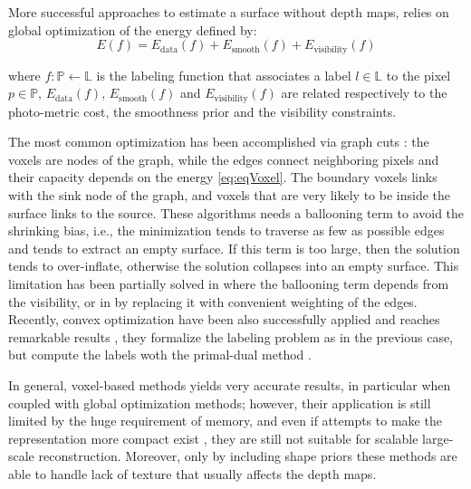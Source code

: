 More successful approaches to estimate a surface without depth maps, relies on global optimization of the energy defined by:
\begin{equation}
\label{eq:eqVoxel}
E(f) = E_{\text{data}}(f) + E_{\text{smooth}} (f) + E_{\text{visibility}} (f)  
\end{equation}


where $f:\mathbb{P}\leftarrow \mathbb{L}$ is the labeling function that associates a label $l\in \mathbb{L}$ to the pixel $p \in\mathbb{P}$, $E_{\text{data}}(f)$, $E_{\text{smooth}} (f)$ and $E_{\text{visibility}} (f)$ are related respectively to the photo-metric cost, the smoothness prior and the visibility constraints.

The most common optimization has been accomplished via graph cuts \cite{vogiatzis2005multi,kolmogorov2002multi,hornung2006hierarchical,furukawa2006carved,mucke2011surface,hernandez2007probabilistic}: the voxels are nodes of the graph, while the edges connect neighboring pixels and their capacity depends on the energy \eqref{eq:eqVoxel}. The boundary voxels links with the sink node of the graph, and voxels that are very likely to be inside the surface links to the source.
These algorithms needs a ballooning term to avoid the shrinking bias, i.e., the minimization tends to traverse as few as possible edges and tends to extract an empty surface. If this term is too large, then the solution tends to over-inflate, otherwise the solution collapses into an empty surface.
This limitation has been partially solved in \cite{hernandez2007probabilistic} where the ballooning term depends  from the visibility, or in \cite{mucke2011surface} by replacing it with convenient weighting of the edges. 
Recently, convex optimization have been also successfully applied and reaches remarkable results
\cite{kolev2009continuous,kolev2010anisotropic,kostrikov2014probabilistic}, they formalize the labeling problem as in the previous case, but compute the labels woth the primal-dual method \cite{mehrotra1992implementation}.




In general, voxel-based methods yields very accurate results, in particular when coupled with global optimization methods; however, their application is still limited by the huge requirement of memory, and even if attempts to make the representation more compact exist \cite{steinbrucker2014volumetric,chen2013scalable,zeng2013octree}, they are still not suitable for scalable large-scale reconstruction.
Moreover, only by including shape priors these methods are able to handle lack of texture \cite{karimi2015segment} that usually affects the depth maps.



